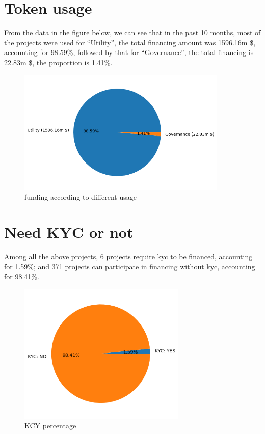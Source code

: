 \documentclass{TTP}
\begin{document}
\section{Token usage}
From the data in the figure below, we can see that in the past 10 months, most of the projects were used for ``Utility'', the total financing amount was 1596.16m \$, accounting for 98.59\%, followed by that for ``Governance'', the total financing is 22.83m \$, the proportion is 1.41\%.
\begin{figure}[h]
  \centering
  \includegraphics[width=10cm]{usage_funding}
  \caption{funding according to different usage}
\end{figure}

\newpage

\section{Need KYC or not}
Among all the above projects, 6 projects require kyc to be financed, accounting for 1.59\%; and 371 projects can participate in financing without kyc, accounting for 98.41\%.
\begin{figure}[h]
  \centering
  \includegraphics[width=8cm]{whether_kyc}
  \caption{KCY percentage}
\end{figure}
\end{document}
